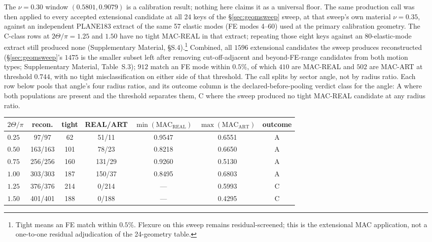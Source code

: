 \documentclass[11pt]{article}
\begin{document}
The $\nu=0.30$ window $(0.5801,0.9079)$ is a calibration result; nothing
here claims it as a universal floor. The same production call was then applied to
every accepted extensional candidate at all 24 keys of the
\S\ref{sec:geomsweep} sweep, at that sweep's own material $\nu=0.35$,
against an independent PLANE183 extract of the same 57 elastic modes
(FE modes 4--60) used at the primary calibration geometry. The C-class rows at $2\Theta/\pi=1.25$
and $1.50$ have no tight MAC-REAL in that extract; repeating those eight
keys against an 80-elastic-mode extract still produced none
(Supplementary Material, §S.4).\footnote{Tight means an FE match
within $0.5\%$. Flexure on this sweep remains residual-screened; this is
the extensional MAC application, not a one-to-one residual adjudication
of the 24-geometry table.} Combined, all $1596$ extensional candidates the sweep produces
reconstructed (\S\ref{sec:geomsweep}'s $1475$ is the smaller subset left
after removing cut-off-adjacent and beyond-FE-range candidates from both
motion types; Supplementary Material, Table~S.3); $912$ match an FE mode within $0.5\%$, of which
$410$ are MAC-REAL and $502$ are MAC-ART at threshold $0.744$, with no
tight misclassification on either side of that threshold. The call splits
by sector angle, not by radius ratio. Each row below pools that angle's four
radius ratios, and its outcome column is the declared-before-pooling verdict class for
the angle: A where both populations are present and the threshold separates
them, C where the sweep produced no tight MAC-REAL candidate at any radius
ratio.

\begin{center}\footnotesize
\begin{tabular}{lcccccc}
\hline
$2\Theta/\pi$ & recon. & tight & REAL/ART &
$\min(\mathrm{MAC_{REAL}})$ & $\max(\mathrm{MAC_{ART}})$ & outcome \\
\hline
$0.25$ & 97/97 & 62 & 51/11 & 0.9547 & 0.6551 & A \\
$0.50$ & 163/163 & 101 & 78/23 & 0.8218 & 0.6650 & A \\
$0.75$ & 256/256 & 160 & 131/29 & 0.9260 & 0.5130 & A \\
$1.00$ & 303/303 & 187 & 150/37 & 0.8495 & 0.6803 & A \\
$1.25$ & 376/376 & 214 & 0/214 & --- & 0.5993 & C \\
$1.50$ & 401/401 & 188 & 0/188 & --- & 0.4295 & C \\
\hline
\end{tabular}
\end{center}
\end{document}

